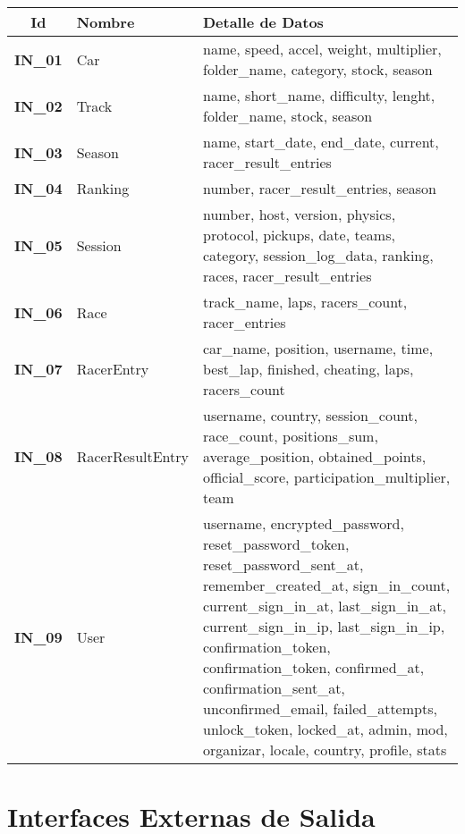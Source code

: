 \begin{center}
	\begin{tabular}{ | c | p{3.5cm} | p{10cm} |}
		\hline
		\textbf{Id} & {\textbf{Nombre}} & {\textbf{Detalle de Datos}} \\ \hline
		{\textbf{IN\_01}} & Car & name, speed, accel, weight, multiplier, folder\_name, category, stock, season \\ \hline
		{\textbf{IN\_02}} & Track &  name, short\_name, difficulty, lenght, folder\_name, stock, season \\ \hline
		{\textbf{IN\_03}} & Season & name, start\_date, end\_date, current, racer\_result\_entries \\ \hline
		{\textbf{IN\_04}} & Ranking & number, racer\_result\_entries, season \\ \hline
		{\textbf{IN\_05}} & Session & number, host, version, physics, protocol, pickups, date, teams, category, session\_log\_data, ranking, races, racer\_result\_entries \\ \hline
		{\textbf{IN\_06}} & Race & track\_name, laps, racers\_count, racer\_entries \\ \hline
		{\textbf{IN\_07}} & RacerEntry & car\_name, position, username, time, best\_lap, finished, cheating, laps, racers\_count\\ \hline
		{\textbf{IN\_08}} & RacerResultEntry & username, country, session\_count, race\_count, positions\_sum, average\_position, obtained\_points, official\_score, participation\_multiplier, team \\ \hline
		{\textbf{IN\_09}} & User & username, encrypted\_password, reset\_password\_token, reset\_password\_sent\_at, remember\_created\_at, sign\_in\_count, current\_sign\_in\_at, last\_sign\_in\_at, current\_sign\_in\_ip, last\_sign\_in\_ip, confirmation\_token, confirmation\_token, confirmed\_at, confirmation\_sent\_at, unconfirmed\_email, failed\_attempts, unlock\_token, locked\_at, admin, mod, organizar, locale, country, profile, stats \\ \hline
	\end{tabular}
  
    \label{table:interfaces:out}
\end{center}

\newpage

\section{Interfaces Externas de Salida}

